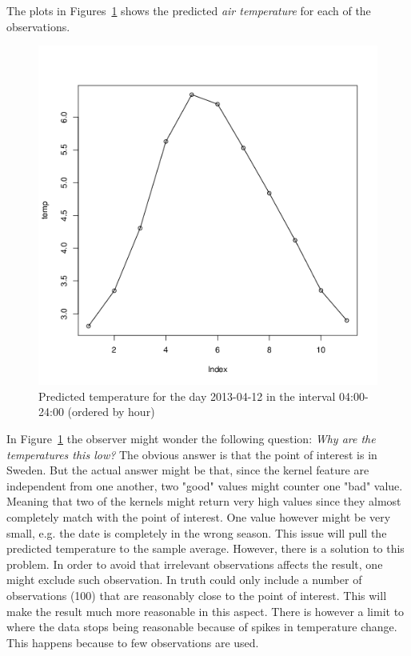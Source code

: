 \documentclass[a4paper, twocolumn]{article}
\begin{document}
    The plots in Figures~\ref{fig:result} shows the predicted \textit{air temperature} for each of the observations. 
    \begin{figure}[H]
    \centering
        \caption{Predicted temperature for the day 2013-04-12 in the interval 04:00-24:00 (ordered by hour)}\label{fig:result}
	    \begin{minipage}[]{0.4\textwidth}
	    	\includegraphics[width=\textwidth]{share/result.png}
	    \end{minipage}
    \end{figure}

	In Figure~\ref{fig:result} the observer might wonder the following question: \textit{Why are the temperatures this low?}\newline
    The obvious answer is that the point of interest is in Sweden. But the actual answer might be that, since the kernel feature are independent from one another, two "good" values might counter one "bad" value. Meaning that two of the kernels might return very high values since they almost completely match with the point of interest. One value however might be very small, e.g. the date is completely in the wrong season. This issue will pull the predicted temperature to the sample average. However, there is a solution to this problem. In order to avoid that irrelevant observations affects the result, one might exclude such observation. In truth could only include a number of observations (100) that are reasonably close to the point of interest. This will make the result much more reasonable in this aspect. There is however a limit to where the data stops being reasonable because of spikes in temperature change. This happens because to few observations are used.
\end{document}
